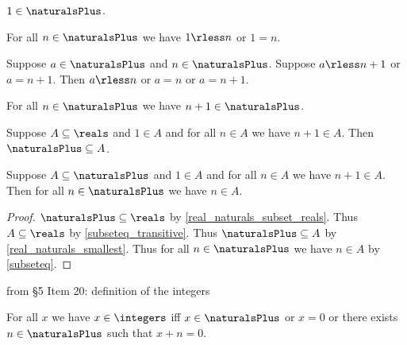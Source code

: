 \begin{axiom}\label{real_one_in_naturals}
    $1\in\naturalsPlus$.
\end{axiom}

\begin{axiom}\label{real_one_leq_naturalsplus}
    For all $n\in\naturalsPlus$ we have $1 \rless n$ or $1 = n$.
\end{axiom}

\begin{axiom}\label{real_succ_discrete}
    Suppose $a\in\naturalsPlus$ and $n\in\naturalsPlus$.
    Suppose $a \rless n + 1$ or $a = n + 1$.
    Then $a \rless n$ or $a = n$ or $a = n + 1$.
\end{axiom}

\begin{axiom}\label{real_naturals_closed_succ}
    For all $n\in\naturalsPlus$ we have $n + 1\in\naturalsPlus$.
\end{axiom} 

\begin{axiom}\label{real_naturals_smallest}
    Suppose $A\subseteq\reals$ and $1\in A$ and for all $n\in A$ we have $n + 1\in A$.
    Then $\naturalsPlus \subseteq A$.
\end{axiom}

\begin{theorem}\label{real_naturals_induction}
    Suppose $A\subseteq\naturalsPlus$ and $1\in A$ and for all $n\in A$ we have $n + 1\in A$.
    Then for all $n\in\naturalsPlus$ we have $n\in A$.
\end{theorem}
\begin{proof}
    $\naturalsPlus \subseteq \reals$ by \cref{real_naturals_subset_reals}.
    Thus $A\subseteq\reals$ by \cref{subseteq_transitive}.
    Thus $\naturalsPlus \subseteq A$ by \cref{real_naturals_smallest}.
    Thus for all $n\in\naturalsPlus$ we have $n\in A$ by \cref{subseteq}.
\end{proof}

from §5 Item 20: definition of the integers
\begin{axiom}\label{real_integers}
    For all $x$ we have $x\in\integers$ iff
    $x\in\naturalsPlus$ or $x=0$ or there exists $n\in\naturalsPlus$ such that $x + n = 0$.
\end{axiom}

